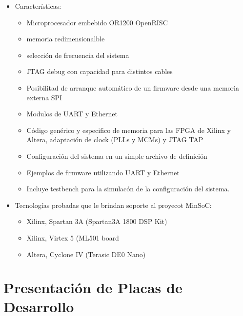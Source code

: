 \begin{itemize}
\item Características:
				\begin{itemize}
				  \item Microprocesador embebido OR1200 OpenRISC 
				  \item memoria redimensionalble
				  \item selección de frecuencia del sistema
				  \item JTAG debug con capacidad para distintos cables
				  \item Posibilitad de arranque automático de un firmware desde una memoria externa SPI
				  \item Modulos de UART y Ethernet 
				  \item Código genérico y especifico de memoria para las FPGA de Xilinx y Altera, adaptación de clock (PLLs y MCMs) y JTAG TAP
				  \item Configuración del sistema en un simple archivo de definición 
				  \item Ejemplos de firmware utilizando UART y Ethernet  
				  \item Incluye testbench para la simulacón de la configuración del sistema. 						
				\end{itemize}

\item Tecnologías probadas que le brindan soporte al proyecot MinSoC:


\begin{itemize}
				  \item Xilinx, Spartan 3A (Spartan3A 1800 DSP Kit)
				  \item Xilinx, Virtex 5 (ML501 board
				  \item Altera, Cyclone IV (Terasic DE0 Nano) 
				\end{itemize}
\end{itemize}

\section{Presentación de Placas de Desarrollo}
 
